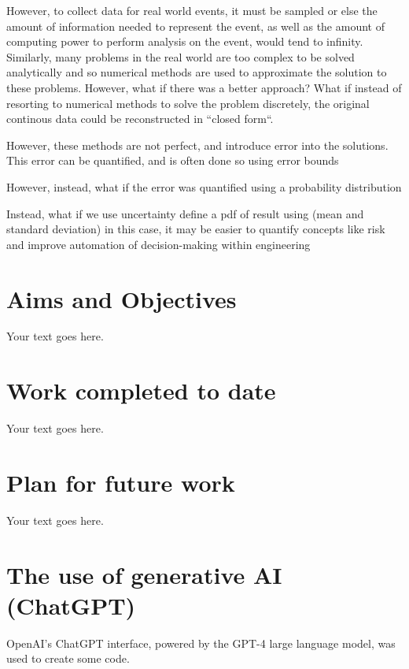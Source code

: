 \documentclass[12pt]{article}
\begin{document}
    However, to collect data for real world events, it must be sampled or else the amount of information needed to represent the event, as well as the amount of computing power to perform analysis on the event, would tend to infinity.
    Similarly, many problems in the real world are too complex to be solved analytically and so numerical methods are used to approximate the solution to these problems.
    However, what if there was a better approach?
    What if instead of resorting to numerical methods to solve the problem discretely, the original continous data could be reconstructed in ``closed form``.

        However, these methods are not perfect, and introduce error into the solutions.
        This error can be quantified, and is often done so using error bounds


    However, instead, what if the error was quantified using a probability distribution

    Instead, what if we use uncertainty define a pdf of result using (mean and standard deviation)
    in this case, it may be easier to quantify concepts like risk and improve automation of decision-making within engineering
    \subsection{}

    \section{Aims and Objectives}
    Your text goes here.

    \section{Work completed to date}
    Your text goes here. \cite{q-candela}
    \section{Plan for future work}
    Your text goes here.

    \appendix
    \section{The use of generative AI (ChatGPT)}
    OpenAI's ChatGPT interface, powered by the GPT-4 large language model, was used to create some code.
\end{document}
